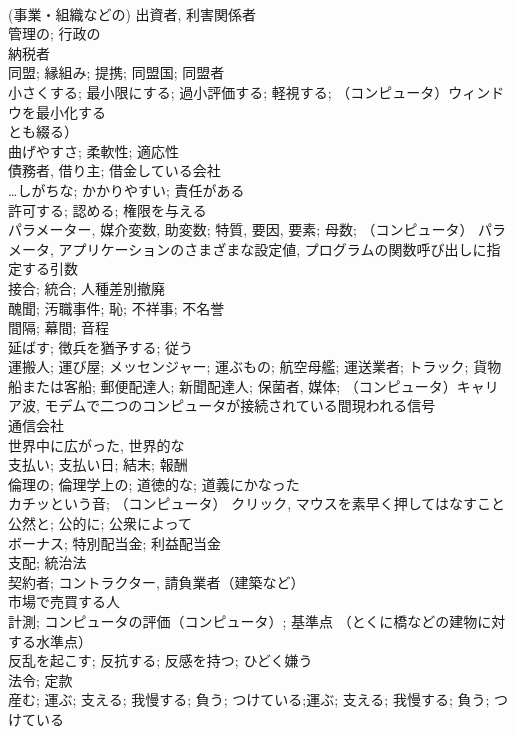 \documentclass[8pt]{extreport}
\begin{document}
\begin{CJK}{UTF8}{min}
\\	(事業・組織などの) 出資者, 利害関係者	
\\	管理の; 行政の	
\\	納税者	
\\	同盟; 縁組み; 提携; 同盟国; 同盟者	
\\	小さくする; 最小限にする; 過小評価する; 軽視する; （コンピュータ）ウィンドウを最小化する
\\	とも綴る）	
\\	曲げやすさ; 柔軟性; 適応性	
\\	債務者, 借り主; 借金している会社	
\\	…しがちな; かかりやすい; 責任がある	
\\	許可する; 認める; 権限を与える	
\\	パラメーター, 媒介変数, 助変数; 特質, 要因, 要素; 母数; （コンピュータ） パラメータ, アプリケーションのさまざまな設定値, プログラムの関数呼び出しに指定する引数	
\\	接合; 統合; 人種差別撤廃	
\\	醜聞; 汚職事件; 恥; 不祥事; 不名誉	
\\	間隔; 幕間; 音程	
\\	延ばす; 徴兵を猶予する; 従う	
\\	運搬人; 運び屋; メッセンジャー; 運ぶもの; 航空母艦; 運送業者; トラック; 貨物船または客船; 郵便配達人; 新聞配達人; 保菌者, 媒体; （コンピュータ）キャリア波, モデムで二つのコンピュータが接続されている間現われる信号 
\\	通信会社	
\\	世界中に広がった, 世界的な	
\\	支払い; 支払い日; 結末; 報酬	
\\	倫理の; 倫理学上の; 道徳的な; 道義にかなった	
\\	カチッという音; （コンピュータ） クリック, マウスを素早く押してはなすこと	
\\	公然と; 公的に; 公衆によって	
\\	ボーナス; 特別配当金; 利益配当金	
\\	支配; 統治法	
\\	契約者; コントラクター, 請負業者（建築など）	
\\	市場で売買する人	
\\	計測; コンピュータの評価（コンピュータ）; 基準点 （とくに橋などの建物に対する水準点）	
\\	反乱を起こす; 反抗する; 反感を持つ; ひどく嫌う	
\\	法令; 定款	
\\	産む; 運ぶ; 支える; 我慢する; 負う; つけている;運ぶ; 支える; 我慢する; 負う; つけている	

\end{CJK}
\end{document}
